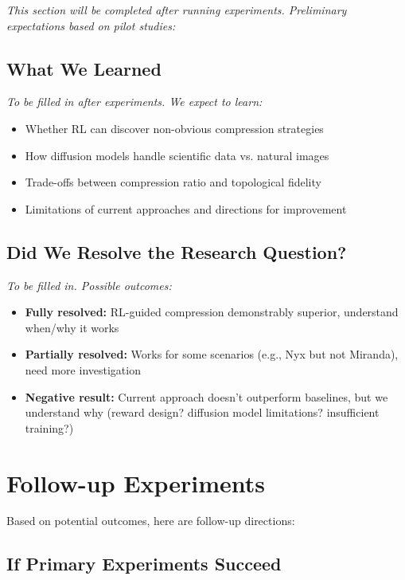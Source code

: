 \documentclass[11pt]{article}
\begin{document}
\textit{This section will be completed after running experiments. Preliminary expectations based on pilot studies:}

\subsection{What We Learned}

\textit{To be filled in after experiments. We expect to learn:}
\begin{itemize}
    \item Whether RL can discover non-obvious compression strategies
    \item How diffusion models handle scientific data vs. natural images
    \item Trade-offs between compression ratio and topological fidelity
    \item Limitations of current approaches and directions for improvement
\end{itemize}

\subsection{Did We Resolve the Research Question?}

\textit{To be filled in. Possible outcomes:}
\begin{itemize}
    \item \textbf{Fully resolved:} RL-guided compression demonstrably superior, understand when/why it works
    \item \textbf{Partially resolved:} Works for some scenarios (e.g., Nyx but not Miranda), need more investigation
    \item \textbf{Negative result:} Current approach doesn't outperform baselines, but we understand why (reward design? diffusion model limitations? insufficient training?)
\end{itemize}

\section{Follow-up Experiments}

Based on potential outcomes, here are follow-up directions:

\subsection{If Primary Experiments Succeed}
\end{document}

